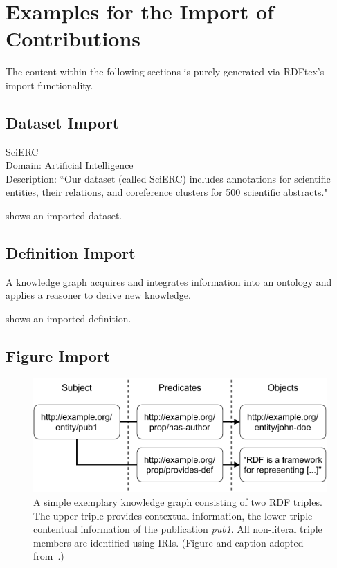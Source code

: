 
\section{Examples for the Import of Contributions}

The content within the following sections is purely generated via RDFtex's import functionality.

\subsection{Dataset Import}


\begin{dataset}
SciERC~\cite{DBLP:conf/emnlp/LuanHOH18}\\
Domain: Artificial Intelligence\\
Description: ``Our dataset (called SciERC) includes annotations for scientific entities, their relations, and coreference clusters for 500 scientific abstracts."~\cite{DBLP:conf/emnlp/LuanHOH18}
\label{dataset:scierc}
\end{dataset}

 shows an imported dataset.

\subsection{Definition Import}


\begin{definition}
\label{def:knowledge-graph}
A knowledge graph acquires and integrates information into an ontology and applies a reasoner to derive new knowledge.
\end{definition}

 shows an imported definition.

\subsection{Figure Import}


\begin{figure}[htb!]
\centering
\includegraphics[max width=0.7\columnwidth]{./figures/triple_example}
\caption{A simple exemplary knowledge graph consisting of two RDF triples. The upper triple provides contextual information, the lower triple contentual information of the publication \emph{{pub1}}. All non-literal triple members are identified using IRIs. (Figure and caption adopted from~\cite{Martin21}.)}
\label{fig:contentual-contextual}
\end{figure}

